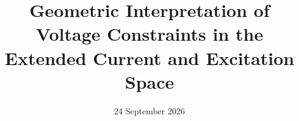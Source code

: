 \title{Geometric Interpretation of Voltage Constraints in the Extended Current and Excitation Space}
\author{}
\date{24 September 2026}
\newcommand{\PaperAbstract}{%
An electrically excited synchronous machine has three current coordinates but
only two stator-voltage components.  This dimensional imbalance changes the
geometry fundamentally: in the linear steady-state model the stator-voltage
quadratic form is positive semidefinite with rank two, so its boundary is an
oblique elliptic cylinder rather than an ellipsoid.  The result is derived by
rank, eigenvalue, null-space, and singular-value arguments and is visualized as
a family of congruent fixed-excitation ellipses.  Torque level sets are
classified as hyperbolic cylinders, whereas a positive-resistance copper-loss
budget is a genuine ellipsoid.  Minimum-loss operation becomes a generalized
eigenvalue problem.  The voltage-only maximum-torque problem is shown to be
generically unbounded, and compact thermal or current limits are introduced to
obtain a well-posed high-speed optimization.  Numerical level-set methods and
hidden finite-domain constraints are discussed for measured and nonlinear
machine maps.}

